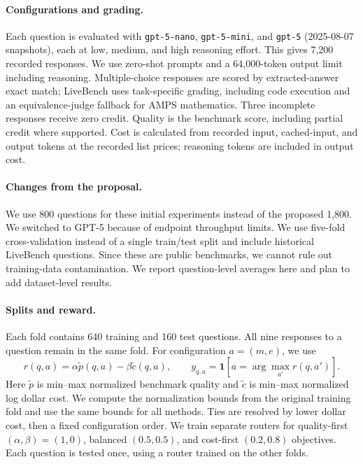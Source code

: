 \documentclass{article}
\begin{document}
\paragraph{Configurations and grading.} Each question is evaluated with \texttt{gpt-5-nano}, \texttt{gpt-5-mini}, and \texttt{gpt-5} (2025-08-07 snapshots), each at low, medium, and high reasoning effort. This gives 7,200 recorded responses. We use zero-shot prompts and a 64,000-token output limit including reasoning. Multiple-choice responses are scored by extracted-answer exact match; LiveBench uses task-specific grading, including code execution and an equivalence-judge fallback for AMPS mathematics. Three incomplete responses receive zero credit. Quality is the benchmark score, including partial credit where supported. Cost is calculated from recorded input, cached-input, and output tokens at the recorded list prices; reasoning tokens are included in output cost.

\paragraph{Changes from the proposal.} We use 800 questions for these initial experiments instead of the proposed 1,800. We switched to GPT-5 because of endpoint throughput limits. We use five-fold cross-validation instead of a single train/test split and include historical LiveBench questions. Since these are public benchmarks, we cannot rule out training-data contamination. We report question-level averages here and plan to add dataset-level results.

\paragraph{Splits and reward.} Each fold contains 640 training and 160 test questions. All nine responses to a question remain in the same fold. For configuration $a=(m,e)$, we use
\begin{equation}
r(q,a)=\alpha\widetilde p(q,a)-\beta\widetilde c(q,a),\qquad
y_{q,a}=\mathbf{1}\!\left[a=\arg\max_{a'}r(q,a')\right].
\end{equation}
Here $\widetilde p$ is min--max normalized benchmark quality and $\widetilde c$ is min--max normalized log dollar cost. We compute the normalization bounds from the original training fold and use the same bounds for all methods. Ties are resolved by lower dollar cost, then a fixed configuration order. We train separate routers for quality-first $(\alpha,\beta)=(1,0)$, balanced $(0.5,0.5)$, and cost-first $(0.2,0.8)$ objectives. Each question is tested once, using a router trained on the other folds.
\end{document}
